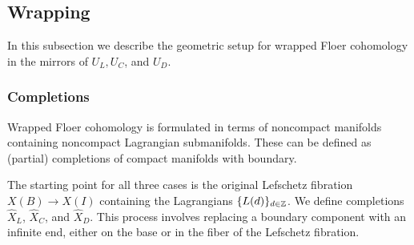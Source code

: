 \documentclass[12pt]{amsart}
\begin{document}
\subsection{Wrapping}
\label{sec:wrapping}

In this subsection we describe the geometric setup for wrapped Floer
cohomology in the mirrors of $U_L,U_C$, and $U_D$. 

\subsubsection{Completions}
\label{sec:completions}

Wrapped Floer cohomology is formulated in terms of noncompact
manifolds containing noncompact Lagrangian submanifolds. These can be
defined as (partial) completions of compact manifolds with boundary.

The starting point for all three cases is the original Lefschetz
fibration $X(B)\to X(I)$ containing the Lagrangians
$\{L(d)\}_{d\in\mathbb{Z}}$. We define completions $\hat{X}_L$, $\hat{X}_C$,
and $\hat{X}_D$. This process involves replacing a boundary component
with an infinite end, either on the base or in the fiber of the
Lefschetz fibration.

\end{document}
